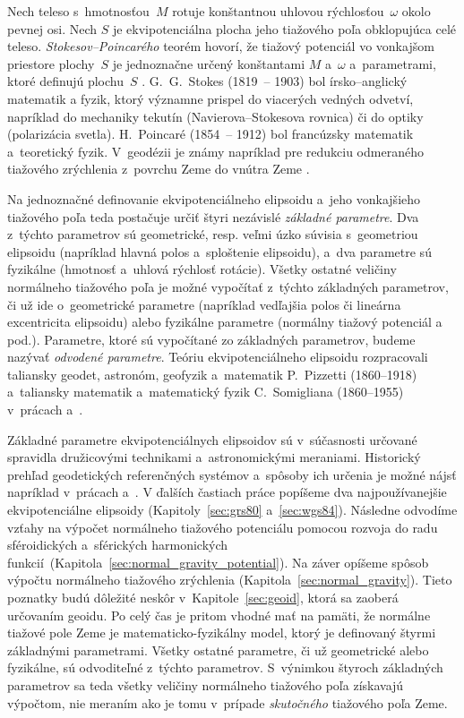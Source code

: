 \documentclass[a4paper, 12pt]{book}
\begin{document}
Nech teleso s~hmotnosťou~$M$ rotuje konštantnou uhlovou rýchlosťou~$\omega$ 
okolo pevnej osi.  Nech $S$ je ekvipotenciálna plocha jeho tiažového poľa 
obklopujúca celé teleso.  \emph{Stokesov--Poincarého} teorém hovorí, že tiažový 
potenciál vo vonkajšom priestore plochy~$S$ je jednoznačne určený konštantami 
$M$ a~$\omega$ a~parametrami, ktoré definujú plochu~$S$ 
\parencite{TorgeGeodesy}.  G.~G.~Stokes (1819~-- 1903) bol írsko--anglický 
matematik a fyzik, ktorý významne prispel do viacerých vedných odvetví, 
napríklad do mechaniky tekutín (Navierova--Stokesova rovnica) či do optiky 
(polarizácia svetla).  H.~Poincaré (1854~-- 1912) bol francúzsky matematik 
a~teoretický fyzik.  V~geodézii je známy napríklad pre redukciu odmeraného 
tiažového zrýchlenia z~povrchu Zeme do vnútra Zeme \parencite[Poincaré--Prey 
redukcia, pozri napríklad][]{MoritzPhysicalGeodesy}.

Na jednoznačné definovanie ekvipotenciálneho elipsoidu a~jeho vonkajšieho 
tiažového poľa teda postačuje určiť štyri nezávislé \emph{základné parametre}.  
Dva z~týchto parametrov sú geometrické, resp. veľmi úzko súvisia s~geometriou 
elipsoidu (napríklad hlavná polos a~sploštenie elipsoidu), a~dva parametre sú 
fyzikálne (hmotnosť a~uhlová rýchlosť rotácie).  Všetky ostatné veličiny 
normálneho tiažového poľa je možné vypočítať z~týchto základných parametrov, či 
už ide o~geometrické parametre (napríklad vedľajšia polos či lineárna 
excentricita elipsoidu) alebo fyzikálne parametre (normálny tiažový potenciál 
a pod.).  Parametre, ktoré sú vypočítané zo základných parametrov, budeme 
nazývať \emph{odvodené parametre}.  Teóriu ekvipotenciálneho elipsoidu 
rozpracovali taliansky geodet, astronóm, geofyzik a~matematik P.~Pizzetti 
(1860--1918) a~taliansky matematik a~matematický fyzik C.~Somigliana 
(1860--1955) v~prácach \textcite{Pizzetti1984} a~\textcite{Somigliana1929}.

Základné parametre ekvipotenciálnych elipsoidov sú v~súčasnosti určované 
spravidla družicovými technikami a~astronomickými meraniami.  Historický 
prehľad geodetických referenčných systémov a~spôsoby ich určenia je možné nájsť 
napríklad v~prácach \textcite{TorgeGeodesy} a~\textcite{MoritzPhysicalGeodesy}.  
V ďalších častiach práce popíšeme dva najpoužívanejšie ekvipotenciálne 
elipsoidy (Kapitoly~\ref{sec:grs80} a~\ref{sec:wgs84}).  Následne odvodíme 
vzťahy na výpočet normálneho tiažového potenciálu pomocou rozvoja do radu 
sféroidických a~sférických harmonických 
funkcií~(Kapitola~\ref{sec:normal_gravity_potential}).  Na záver opíšeme spôsob 
výpočtu normálneho tiažového zrýchlenia (Kapitola~\ref{sec:normal_gravity}).  
Tieto poznatky budú dôležité neskôr v~Kapitole~\ref{sec:geoid}, ktorá sa 
zaoberá určovaním geoidu.  Po celý čas je pritom vhodné mať na pamäti, že 
normálne tiažové pole Zeme je matematicko-fyzikálny model, ktorý je definovaný 
štyrmi základnými parametrami.  Všetky ostatné parametre, či už geometrické 
alebo fyzikálne, sú odvoditeľné z~týchto parametrov.  S~výnimkou štyroch 
základných parametrov sa teda všetky veličiny normálneho tiažového poľa 
získavajú výpočtom, nie meraním ako je tomu v~prípade \emph{skutočného} 
tiažového poľa Zeme.
\end{document}
